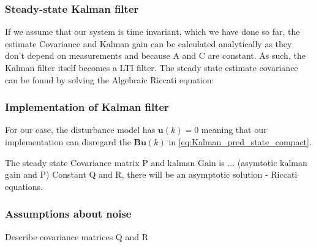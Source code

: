 
\subsubsection{Steady-state Kalman filter}
If we assume that our system is time invariant, which we have done so far, the estimate Covariance and Kalman gain can be calculated analytically as they don't depend on measurements and because A and C are constant. As such, the Kalman filter itself becomes a LTI filter. The steady state estimate covariance can be found by solving the Algebraic Riccati equation:

	


\subsubsection{Implementation of Kalman filter}
For our case, the disturbance model has $ \textbf{u}(k)=0 $ meaning that our implementation can disregard the $ \textbf{B}\textbf{u}(k) $ in \cref{eq:Kalman_pred_state_compact}.


The steady state Covariance matrix P and kalman Gain is ... (asymtotic kalman gain and P)
Constant Q and R, there will be an asymptotic solution - Riccati equations. 

\subsubsection{Assumptions about noise}
Describe covariance matrices Q and R\\



